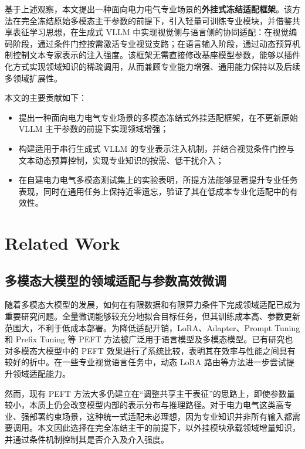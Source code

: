 \documentclass[journal]{IEEEtran}
\begin{document}
基于上述观察，本文提出一种面向电力电气专业场景的\textbf{外挂式冻结适配框架}。该方法在完全冻结原始多模态主干参数的前提下，引入轻量可训练专业模块，并借鉴共享表征学习思想，在生成式 VLLM 中实现视觉侧与语言侧的协同适配：在视觉编码阶段，通过条件门控按需激活专业视觉支路；在语言输入阶段，通过动态预算机制控制文本专家表示的注入强度。该框架无需直接修改基座模型参数，能够以插件化方式实现领域知识的稀疏调用，从而兼顾专业能力增强、通用能力保持以及后续多领域扩展性。

本文的主要贡献如下：
\begin{itemize}
    \item 提出一种面向电力电气专业场景的多模态冻结式外挂适配框架，在不更新原始 VLLM 主干参数的前提下实现领域增强；
    \item 构建适用于串行生成式 VLLM 的专业表示注入机制，并结合视觉条件门控与文本动态预算控制，实现专业知识的按需、低干扰介入；
    \item 在自建电力电气多模态测试集上的实验表明，所提方法能够显著提升专业任务表现，同时在通用任务上保持近零遗忘，验证了其在低成本专业化适配中的有效性。
\end{itemize}


\section{Related Work}

\subsection{多模态大模型的领域适配与参数高效微调}

随着多模态大模型的发展，如何在有限数据和有限算力条件下完成领域适配已成为重要研究问题\cite{zhou2024empirical}。全量微调能够较充分地拟合目标任务，但其训练成本高、参数更新范围大，不利于低成本部署。为降低适配开销，LoRA、Adapter、Prompt Tuning 和 Prefix Tuning 等 PEFT 方法被广泛用于语言模型及多模态模型\cite{hu2022lora,wang2025parameter}。已有研究也对多模态大模型中的 PEFT 效果进行了系统比较，表明其在效率与性能之间具有较好的折中\cite{zhou2024empirical}。在一些专业视觉语言任务中，动态 LoRA 路由等方法进一步尝试提升领域适配能力\cite{wu2026domain}。

然而，现有 PEFT 方法大多仍建立在“调整共享主干表征”的思路上，即使参数量较小，本质上仍会改变模型内部的表示分布与推理路径。对于电力电气这类高专业、强部署约束场景，这种统一式适配未必理想，因为专业知识并非所有输入都需要调用。本文因此选择在完全冻结主干的前提下，以外挂模块承载领域增量知识，并通过条件机制控制其是否介入及介入强度。
\end{document}
